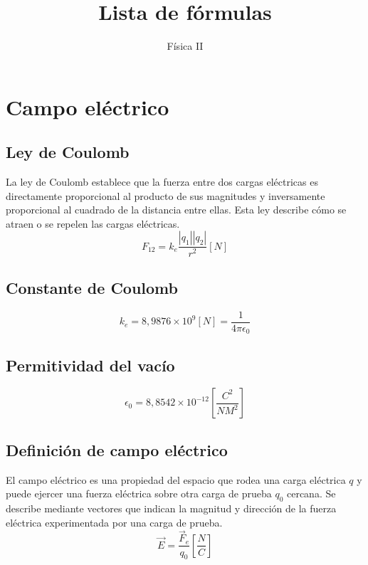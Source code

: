 \documentclass{report}
\title{Lista de fórmulas}
\date{}
\author{Física II}
\begin{document}
  \maketitle
  \setcounter{tocdepth}{5}
  \tableofcontents
  \section*{Campo eléctrico}
    \subsection*{Ley de Coulomb}
      La ley de Coulomb establece que la fuerza entre dos cargas eléctricas es directamente 
      proporcional al producto de sus magnitudes y inversamente proporcional al cuadrado de 
      la distancia entre ellas. Esta ley describe cómo se atraen o se repelen las cargas eléctricas.
      \begin{equation*}
        F_{12}=k_e\frac{|q_1||q_2|}{r^2}[N]
      \end{equation*}
    \subsection*{Constante de Coulomb}
      \begin{equation*}
        k_e=8,9876\times10^9[N]=\frac{1}{4\pi\epsilon_0}
      \end{equation*}
    \subsection*{Permitividad del vacío}
      \begin{equation*}
        \epsilon_0=8,8542\times10^{-12}\left[\frac{C^2}{NM^2}\right]
      \end{equation*}
    \subsection*{Definición de campo eléctrico}
      El campo eléctrico es una propiedad del espacio que rodea una carga eléctrica $q$ y puede ejercer una 
      fuerza eléctrica sobre otra carga de prueba $q_0$ cercana. Se describe mediante vectores que indican la 
      magnitud y dirección de la fuerza eléctrica experimentada por una carga de prueba.
      \begin{equation*}
        \overrightarrow{E}=\frac{\overrightarrow{F}_e}{q_0}\left[\frac{N}{C}\right]
      \end{equation*}
\end{document}
